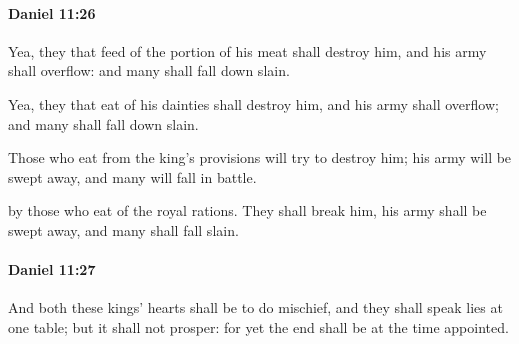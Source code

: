 		\paragraph{Daniel 11:26} %
			\label{DANIEL-11-26}

			Yea, they that feed of the portion of his meat shall destroy him, and his army shall overflow: and many shall fall down slain.

			\begin{versebox}
					\item[BHS] 
					\item[LXX] 
					\item[ASV] Yea, they that eat of his dainties shall destroy him, and his army shall overflow; and many shall fall down slain.
					\item[NIV] Those who eat from the king’s provisions will try to destroy him; his army will be swept away, and many will fall in battle.
					\item[NRSV] by those who eat of the royal rations. They shall break him, his army shall be swept away, and many shall fall slain.
			\end{versebox}

		\paragraph{Daniel 11:27} %
			\label{DANIEL-11-27}

			And both these kings’ hearts shall be to do mischief, and they shall speak lies at one table; but it shall not prosper: for yet the end shall be at the time appointed.

